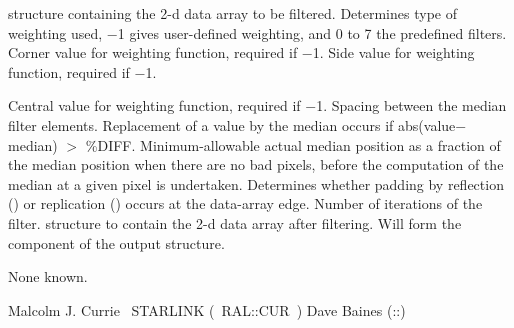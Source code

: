 {\begin{manroutinedescription}
\begin{manparametertable}
  {} structure containing the 2-d data array to be filtered.
  Determines type of weighting used, {$-$}1 gives user-defined
  weighting, and 0 to 7 the predefined filters. {\mantt{[0]}}
  Corner value for weighting function, required  if {}
  {\mantt{=}} {$-$}1.
  Side value for weighting function, required if {}
  {\mantt{=}} {$-$}1.
\end{manparametertable}
\begin{manparametertable}
  Central value for weighting function, required if {}
  {\mantt{=}} {$-$}1.
  Spacing between the median filter elements. {\mantt{[1]}}
  Replacement of a value by the median occurs if \hbox{abs(value{$-$}median)}
  {$>$} {\mantt \%DIFF}. \mbox{{\mantt [0.0]}}
  Minimum-allowable actual median position as a fraction of
  the median position when there are no bad pixels, before the computation
  of the median at a given pixel is undertaken. \mbox{{\mantt [0.8]}}
  Determines whether padding by reflection ({}) or
  replication ({}) occurs at the data-array edge.
  \mbox{{\mantt ['Replicate']}}
  Number of iterations of the filter. \mbox{{\mantt [1]}}
  {} structure to contain the 2-d data array after filtering.
  Will form the {} component of the output {}
  structure. \mbox{{}}
\end{manparametertable}
  None known.

  Malcolm J. Currie ~STARLINK \mbox{( {\mantt RAL}::{\mantt CUR} )}
  Dave Baines ({}::{})
\end{manroutinedescription}
 
}
